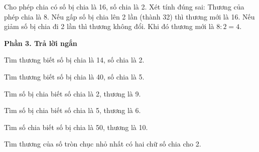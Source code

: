 \begin{ex} %
Cho phép chia có số bị chia là 16, số chia là 2. Xét tính đúng sai:
\choiceTF
{\True Thương của phép chia là 8.}
{\True Nếu gấp số bị chia lên 2 lần (thành 32) thì thương mới là 16.}
{Nếu giảm số bị chia đi 2 lần thì thương không đổi.}
{\True Khi đó thương mới là $8 : 2 = 4$.}
\end{ex}

\textbf{Phần 3. Trả lời ngắn}

\begin{ex} %
Tìm thương biết số bị chia là 14, số chia là 2.
\end{ex}

\begin{ex} %
Tìm thương biết số bị chia là 40, số chia là 5.
\end{ex}

\begin{ex} %
Tìm số bị chia biết số chia là 2, thương là 9.
\end{ex}

\begin{ex} %
Tìm số bị chia biết số chia là 5, thương là 6.
\end{ex}

\begin{ex} %
Tìm số chia biết số bị chia là 50, thương là 10.
\end{ex}

\begin{ex} %
Tìm thương của số tròn chục nhỏ nhất có hai chữ số chia cho 2.
\end{ex}
